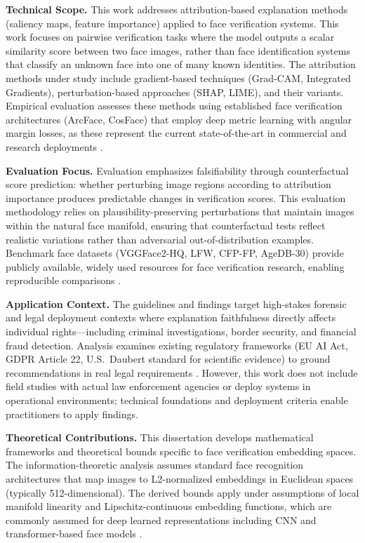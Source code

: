 \textbf{Technical Scope.} This work addresses attribution-based explanation methods (sa\-liency maps, feature importance) applied to face verification systems. This work focuses on pairwise verification tasks where the model outputs a scalar similarity score between two face images, rather than face identification systems that classify an unknown face into one of many known identities. The attribution methods under study include gradient-based techniques (Grad-CAM, Integrated Gradients), perturbation-based approaches (SHAP, LIME), and their variants. Empirical evaluation assesses these methods using established face verification architectures (ArcFace, CosFace) that employ deep metric learning with angular margin losses, as these represent the current state-of-the-art in commercial and research deployments \cite{deng2019arcface,wang2018cosface}.

\textbf{Evaluation Focus.} Evaluation emphasizes falsifiability through counterfactual score prediction: whether perturbing image regions according to attribution importance produces predictable changes in verification scores. This evaluation methodology relies on plausibility-preserving perturbations that maintain images within the natural face manifold, ensuring that counterfactual tests reflect realistic variations rather than adversarial out-of-distribution examples. Benchmark face datasets (VGGFace2-HQ, LFW, CFP-FP, AgeDB-30) provide publicly available, widely used resources for face verification research, enabling reproducible comparisons \cite{cao2018vggface2,huang2007lfw,sengupta2016cfp,moschoglou2017agedb}.

\textbf{Application Context.} The guidelines and findings target high-stakes forensic and legal deployment contexts where explanation faithfulness directly affects individual rights---including criminal investigations, border security, and financial fraud detection. Analysis examines existing regulatory frameworks (EU AI Act, GDPR Article 22, U.S.\ Daubert standard for scientific evidence) to ground recommendations in real legal requirements \cite{euaiact2024,gdpr2016,fed702,daubert1993}. However, this work does not include field studies with actual law enforcement agencies or deploy systems in operational environments; technical foundations and deployment criteria enable practitioners to apply findings.

\textbf{Theoretical Contributions.} This dissertation develops mathematical frameworks and theoretical bounds specific to face verification embedding spaces. The information-theoretic analysis assumes standard face recognition architectures that map images to L2-normalized embeddings in Euclidean spaces (typically 512-dimensional). The derived bounds apply under assumptions of local manifold linearity and Lipschitz-continuous embedding functions, which are commonly assumed for deep learned representations \cite{bengio2013manifold} including CNN and transformer-based face models \cite{deng2019arcface}.

